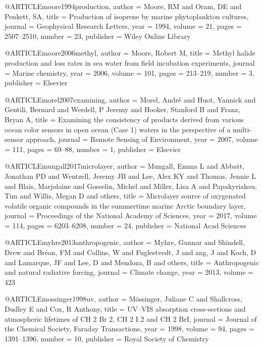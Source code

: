 @ARTICLE{moore1994production,
  author = {Moore, RM and Oram, DE and Penkett, SA},
  title = {Production of isoprene by marine phytoplankton cultures},
  journal = {Geophysical Research Letters},
  year = {1994},
  volume = {21},
  pages = {2507--2510},
  number = {23},
  publisher = {Wiley Online Library}
}

@ARTICLE{moore2006methyl,
  author = {Moore, Robert M},
  title = {Methyl halide production and loss rates in sea water from field incubation
	experiments},
  journal = {Marine chemistry},
  year = {2006},
  volume = {101},
  pages = {213--219},
  number = {3},
  publisher = {Elsevier}
}

@ARTICLE{morel2007examining,
  author = {Morel, Andr{\'e} and Huot, Yannick and Gentili, Bernard and Werdell,
	P Jeremy and Hooker, Stanford B and Franz, Bryan A},
  title = {Examining the consistency of products derived from various ocean
	color sensors in open ocean (Case 1) waters in the perspective of
	a multi-sensor approach},
  journal = {Remote Sensing of Environment},
  year = {2007},
  volume = {111},
  pages = {69--88},
  number = {1},
  publisher = {Elsevier}
}

@ARTICLE{mungall2017microlayer,
  author = {Mungall, Emma L and Abbatt, Jonathan PD and Wentzell, Jeremy JB and
	Lee, Alex KY and Thomas, Jennie L and Blais, Marjolaine and Gosselin,
	Michel and Miller, Lisa A and Papakyriakou, Tim and Willis, Megan
	D and others},
  title = {Microlayer source of oxygenated volatile organic compounds in the
	summertime marine Arctic boundary layer},
  journal = {Proceedings of the National Academy of Sciences},
  year = {2017},
  volume = {114},
  pages = {6203--6208},
  number = {24},
  publisher = {National Acad Sciences}
}

@ARTICLE{myhre2013anthropogenic,
  author = {Myhre, Gunnar and Shindell, Drew and Br{\'e}on, FM and Collins, W
	and Fuglestvedt, J and ang, J and Koch, D and Lamarque, JF and Lee,
	D and Mendoza, B and others},
  title = {Anthropogenic and natural radiative forcing},
  journal = {Climate change},
  year = {2013},
  volume = {423}
}

@ARTICLE{mossinger1998uv,
  author = {M{\"o}ssinger, Juliane C and Shallcross, Dudley E and Cox, R Anthony},
  title = {UV--VIS absorption cross-sections and atmospheric lifetimes of CH
	2 Br 2, CH 2 I 2 and CH 2 BrI},
  journal = {Journal of the Chemical Society, Faraday Transactions},
  year = {1998},
  volume = {94},
  pages = {1391--1396},
  number = {10},
  publisher = {Royal Society of Chemistry}
}

